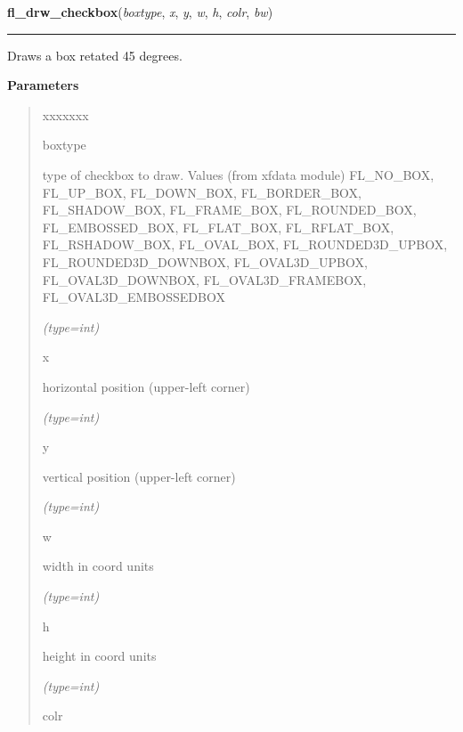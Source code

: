 \hspace{.8\funcindent}\begin{boxedminipage}{\funcwidth}

    \raggedright \textbf{fl\_drw\_checkbox}(\textit{boxtype}, \textit{x}, \textit{y}, \textit{w}, \textit{h}, \textit{colr}, \textit{bw})

    \vspace{-1.5ex}

    \rule{\textwidth}{0.5\fboxrule}
\setlength{\parskip}{2ex}
    Draws a box retated 45 degrees.

\setlength{\parskip}{1ex}
      \textbf{Parameters}
      \vspace{-1ex}

      \begin{quote}
        \begin{Ventry}{xxxxxxx}

          \item[boxtype]

          type of checkbox to draw. Values (from xfdata module) 
          FL\_NO\_BOX, FL\_UP\_BOX, FL\_DOWN\_BOX, FL\_BORDER\_BOX, 
          FL\_SHADOW\_BOX, FL\_FRAME\_BOX, FL\_ROUNDED\_BOX, 
          FL\_EMBOSSED\_BOX, FL\_FLAT\_BOX, FL\_RFLAT\_BOX, 
          FL\_RSHADOW\_BOX, FL\_OVAL\_BOX, FL\_ROUNDED3D\_UPBOX, 
          FL\_ROUNDED3D\_DOWNBOX, FL\_OVAL3D\_UPBOX, FL\_OVAL3D\_DOWNBOX, 
          FL\_OVAL3D\_FRAMEBOX, FL\_OVAL3D\_EMBOSSEDBOX

            {\it (type=int)}

          \item[x]

          horizontal position (upper-left corner)

            {\it (type=int)}

          \item[y]

          vertical position (upper-left corner)

            {\it (type=int)}

          \item[w]

          width in coord units

            {\it (type=int)}

          \item[h]

          height in coord units

            {\it (type=int)}

          \item[colr]


\end{Ventry}
\end{quote}
\end{boxedminipage}
